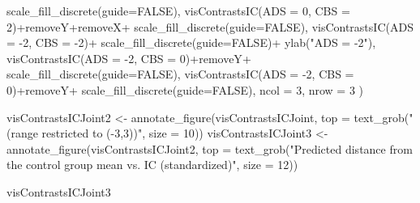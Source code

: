 \documentclass[
  10pt,
  dvipsnames,enabledeprecatedfontcommands]{scrartcl}
\newenvironment{Shaded}{\begin{snugshade}}{\end{snugshade}}
\newcommand{\AttributeTok}[1]{\textcolor[rgb]{0.77,0.63,0.00}{#1}}
\newcommand{\ConstantTok}[1]{\textcolor[rgb]{0.00,0.00,0.00}{#1}}
\newcommand{\DecValTok}[1]{\textcolor[rgb]{0.00,0.00,0.81}{#1}}
\newcommand{\FunctionTok}[1]{\textcolor[rgb]{0.00,0.00,0.00}{#1}}
\newcommand{\NormalTok}[1]{#1}
\newcommand{\OtherTok}[1]{\textcolor[rgb]{0.56,0.35,0.01}{#1}}
\newcommand{\SpecialCharTok}[1]{\textcolor[rgb]{0.00,0.00,0.00}{#1}}
\newcommand{\StringTok}[1]{\textcolor[rgb]{0.31,0.60,0.02}{#1}}
\begin{document}
\begin{Shaded}
\begin{Highlighting}[]
  \FunctionTok{scale\_fill\_discrete}\NormalTok{(}\AttributeTok{guide=}\ConstantTok{FALSE}\NormalTok{),}
    \FunctionTok{visContrastsIC}\NormalTok{(}\AttributeTok{ADS =} \DecValTok{0}\NormalTok{, }\AttributeTok{CBS =} \DecValTok{2}\NormalTok{)}\SpecialCharTok{+}\NormalTok{removeY}\SpecialCharTok{+}\NormalTok{removeX}\SpecialCharTok{+} \FunctionTok{scale\_fill\_discrete}\NormalTok{(}\AttributeTok{guide=}\ConstantTok{FALSE}\NormalTok{),  }
\FunctionTok{visContrastsIC}\NormalTok{(}\AttributeTok{ADS =} \SpecialCharTok{{-}}\DecValTok{2}\NormalTok{, }\AttributeTok{CBS =} \SpecialCharTok{{-}}\DecValTok{2}\NormalTok{)}\SpecialCharTok{+} \FunctionTok{scale\_fill\_discrete}\NormalTok{(}\AttributeTok{guide=}\ConstantTok{FALSE}\NormalTok{)}\SpecialCharTok{+}
  \FunctionTok{ylab}\NormalTok{(}\StringTok{"ADS = {-}2"}\NormalTok{),}
    \FunctionTok{visContrastsIC}\NormalTok{(}\AttributeTok{ADS =} \SpecialCharTok{{-}}\DecValTok{2}\NormalTok{, }\AttributeTok{CBS =} \DecValTok{0}\NormalTok{)}\SpecialCharTok{+}\NormalTok{removeY}\SpecialCharTok{+} \FunctionTok{scale\_fill\_discrete}\NormalTok{(}\AttributeTok{guide=}\ConstantTok{FALSE}\NormalTok{),}
    \FunctionTok{visContrastsIC}\NormalTok{(}\AttributeTok{ADS =} \SpecialCharTok{{-}}\DecValTok{2}\NormalTok{, }\AttributeTok{CBS =} \DecValTok{0}\NormalTok{)}\SpecialCharTok{+}\NormalTok{removeY}\SpecialCharTok{+} \FunctionTok{scale\_fill\_discrete}\NormalTok{(}\AttributeTok{guide=}\ConstantTok{FALSE}\NormalTok{), }
\AttributeTok{ncol =} \DecValTok{3}\NormalTok{, }\AttributeTok{nrow =} \DecValTok{3}
\NormalTok{)}

\NormalTok{visContrastsICJoint2 }\OtherTok{\textless{}{-}} \FunctionTok{annotate\_figure}\NormalTok{(visContrastsICJoint, }
\AttributeTok{top =} \FunctionTok{text\_grob}\NormalTok{(}\StringTok{"(range restricted to ({-}3,3))"}\NormalTok{, }
                \AttributeTok{size =} \DecValTok{10}\NormalTok{))}
\NormalTok{visContrastsICJoint3 }\OtherTok{\textless{}{-}} \FunctionTok{annotate\_figure}\NormalTok{(visContrastsICJoint2, }
 \AttributeTok{top =} \FunctionTok{text\_grob}\NormalTok{(}\StringTok{"Predicted distance from the control group mean vs. IC (standardized)"}\NormalTok{,}
                \AttributeTok{size =} \DecValTok{12}\NormalTok{))}

\NormalTok{visContrastsICJoint3}
\end{Highlighting}
\end{Shaded}
\end{document}
